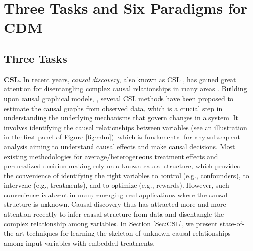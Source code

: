 \section{Three Tasks and Six Paradigms for \acrshort{CDM} }\label{sec:3task6paradigm}

\subsection{Three Tasks} \label{sec:3tasks}

\textbf{\acrlong{CSL}.} In recent years, \textit{causal discovery}, also known as \acrshort{CSL} \citep[e.g.,][]{pearl2000causality,peters2017elements}, has gained great attention for disentangling complex causal relationships in many areas \citep[e.g.,][]{nandy2017estimating,chakrabortty2018inference,cai2020anoce}. Building upon causal graphical models, \citep[see Section \ref{sec:prelim_CSL} and][for a comprehensive review]{pearl2009causal}, several CSL methods have been proposed \citep[e.g.,][]{spirtes2000constructing,shimizu2006linear,kalisch2007estimating,buhlmann2014cam,zheng2018dags,yu2019dag,zhu2019causal} to estimate the causal graphs from observed data, which is a crucial step in understanding the underlying mechanisms that govern changes in a system. It involves identifying the causal relationships between variables (see an illustration in the first panel of Figure \ref{fig:cdm}), which is fundamental for any subsequent analysis aiming to understand causal effects and make causal decisions. Most existing methodologies for average/heterogeneous treatment effects and personalized decision-making rely on a known causal structure, which provides the convenience of identifying the right variables to control (e.g., confounders), to intervene (e.g., treatments), and to optimize (e.g., rewards). However, such convenience is absent in many emerging real applications where the causal structure is unknown. Causal discovery thus has attracted more and more attention recently to infer causal structure from data and disentangle the complex relationship among variables.  In Section \ref{Sec:CSL}, we present state-of-the-art techniques for learning the skeleton of unknown causal relationships among input variables with embedded treatments.

